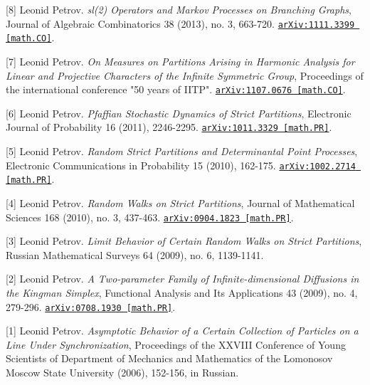 \begin{etaremune}
\item[{[8]}] 
Leonid Petrov.
\emph{sl(2) Operators and Markov Processes on Branching Graphs}, Journal of Algebraic Combinatorics 38 (2013), no. 3, 663-720. 
\href{https://arxiv.org/abs/1111.3399}{\texttt{arXiv:1111.3399 [math.CO]}}.







\item[{[7]}] 
Leonid Petrov.
\emph{On Measures on Partitions Arising in Harmonic Analysis for Linear and Projective Characters of the Infinite Symmetric Group}, Proceedings of the international conference "50 years of IITP". 
\href{https://arxiv.org/abs/1107.0676}{\texttt{arXiv:1107.0676 [math.CO]}}.





\item[{[6]}] 
Leonid Petrov.
\emph{Pfaffian Stochastic Dynamics of Strict Partitions}, Electronic Journal of Probability 16 (2011), 2246-2295. 
\href{https://arxiv.org/abs/1011.3329}{\texttt{arXiv:1011.3329 [math.PR]}}.



\item[{[5]}] 
Leonid Petrov.
\emph{Random Strict Partitions and Determinantal Point Processes}, Electronic Communications in Probability 15 (2010), 162-175. 
\href{https://arxiv.org/abs/1002.2714}{\texttt{arXiv:1002.2714 [math.PR]}}.







\item[{[4]}] 
Leonid Petrov.
\emph{Random Walks on Strict Partitions}, Journal of Mathematical Sciences 168 (2010), no. 3, 437-463. 
\href{https://arxiv.org/abs/0904.1823}{\texttt{arXiv:0904.1823 [math.PR]}}.



\item[{[3]}] 
Leonid Petrov.
\emph{Limit Behavior of Certain Random Walks on Strict Partitions}, Russian Mathematical Surveys 64 (2009), no. 6, 1139-1141. 




\item[{[2]}] 
Leonid Petrov.
\emph{A Two-parameter Family of Infinite-dimensional Diffusions in the Kingman Simplex}, Functional Analysis and Its Applications 43 (2009), no. 4, 279-296. 
\href{https://arxiv.org/abs/0708.1930}{\texttt{arXiv:0708.1930 [math.PR]}}.



\item[{[1]}] 
Leonid Petrov.
\emph{Asymptotic Behavior of a Certain Collection of Particles on a Line Under Synchronization}, Proceedings of the XXVIII Conference of Young Scientists of Department of Mechanics and Mathematics of the Lomonosov Moscow State University (2006), 152-156, in Russian. 



\end{etaremune}


